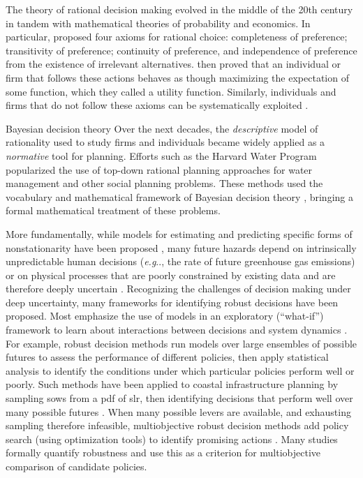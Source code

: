 \documentclass[11pt]{article}
\makeatletter
\DeclareRobustCommand\onedot{\futurelet\@let@token\@onedot}
\def\@onedot{\ifx\@let@token.\else.\null\fi\xspace}
\def\eg{\emph{e.g}\onedot} \def\Eg{\emph{E.g}\onedot}
\DeclareRobustCommand\onedot{\futurelet\@let@token\@onedot}
\def\@onedot{\ifx\@let@token.\else.\null\fi\xspace}
\def\eg{\emph{e.g}\onedot} \def\Eg{\emph{E.g}\onedot}
\makeatother
\begin{document}
The theory of rational decision making evolved in the middle of the 20th century in tandem with mathematical theories of probability and economics.
In particular, \citet{vonneumann_games:1944} proposed four axioms for rational choice:
completeness of preference;
transitivity of preference;
continuity of preference, and
independence of preference from the existence of irrelevant alternatives.
\citeauthor{vonneumann_games:1944} then proved that an individual or firm that follows these actions behaves as though maximizing the expectation of some function, which they called a utility function.
Similarly, individuals and firms that do not follow these axioms can be systematically exploited \citep[see the ``Dutch book'' arguments of][]{definetti_probability:1972}.

Bayesian decision theory \citep{savage:1954}
Over the next decades, the \emph{descriptive} model of rationality used to study firms and individuals \citep[see][]{savage:1954,debreu:1959} became widely applied as a \emph{normative} tool for planning.
Efforts such as the Harvard Water Program \citep[see][]{maass_hwp:1962} popularized the use of top-down rational planning approaches for water management \citep{howe_bca:1971} and other social planning problems.
These methods used the vocabulary and mathematical framework of Bayesian decision theory \citep{Gelman:2014tc,savage:1954}, bringing a formal mathematical treatment of these problems.

More fundamentally, while models for estimating and predicting specific forms of nonstationarity have been proposed \citep[see][for a review]{Salas:2018ge}, many future hazards depend on intrinsically unpredictable human decisions (\eg, the rate of future greenhouse gas emissions) or on physical processes that are poorly constrained by existing data \citep[\eg, collapse of the West Antarctic ice sheet; see][]{deconto_antarctica:2016} and are therefore deeply uncertain \citep{keller_management:2021,walker_deep:2013,lempert_complex:2002}.
Recognizing the challenges of decision making under deep uncertainty, many frameworks for identifying robust decisions have been proposed.
Most emphasize the use of models in an exploratory (``what-if'') framework to learn about interactions between decisions and system dynamics \citep{bankes:1993}.
For example, robust decision methods \citep{lempert_shaping:2003} run models over large ensembles of possible futures to assess the performance of different policies, then apply statistical analysis to identify the conditions under which particular policies perform well or poorly.
Such methods have been applied to coastal infrastructure planning by sampling \glspl{sow} from a \gls{pdf} of \gls{slr}, then identifying decisions that perform well over many possible futures \citep{sriver_sealevel:2018,lempert_slr:2012,wong_nola:2017}.
When many possible levers are available, and exhausting sampling therefore infeasible, multiobjective robust decision methods \citep{kasprzyk:2013} add policy search (using optimization tools) to identify promising actions \citep{kasprzyk:2013,kasprzyk_denovo:2012,hadka_mordm:2015}.
Many studies formally quantify robustness \citep{herman:2015,mcphail_robustness:2019} and use this as a criterion for multiobjective comparison of candidate policies.
\end{document}
